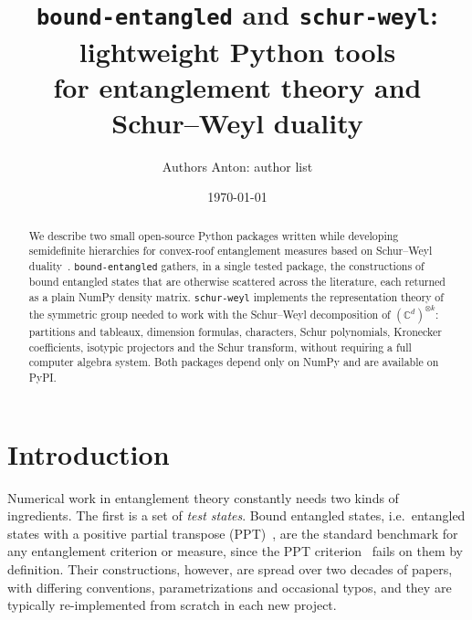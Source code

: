 \documentclass[aps,pra,twocolumn,superscriptaddress,groupedaddress]{revtex4-2}
\newcommand{\C}{\mathds{C}}
\newcommand{\code}[1]{\texttt{#1}}
\newcommand{\anton}[1]{{\color{antongreen} Anton: #1}}
\begin{document}
\title{\code{bound-entangled} and \code{schur-weyl}: lightweight Python tools\\
for entanglement theory and Schur--Weyl duality}

\author{Authors \anton{author list}}

\date{\today}

\begin{abstract}
We describe two small open-source Python packages written while developing
semidefinite hierarchies for convex-roof entanglement measures based on
Schur--Weyl duality~\cite{mainpaper}. \code{bound-entangled} gathers, in a
single tested package, the constructions of bound entangled states that are
otherwise scattered across the literature, each returned as a plain NumPy
density matrix. \code{schur-weyl} implements the representation theory of the
symmetric group needed to work with the Schur--Weyl decomposition of
$(\C^d)^{\otimes k}$: partitions and tableaux, dimension formulas, characters,
Schur polynomials, Kronecker coefficients, isotypic projectors and the Schur
transform, without requiring a full computer algebra system. Both packages
depend only on NumPy and are available on PyPI.
\end{abstract}

\maketitle

\section{Introduction}

Numerical work in entanglement theory constantly needs two kinds of
ingredients. The first is a set of \emph{test states}. Bound entangled states,
i.e.\ entangled states with a positive partial transpose
(PPT)~\cite{Horodecki1998}, are the standard benchmark for any entanglement
criterion or measure, since the PPT criterion~\cite{Peres1996} fails on them by
definition. Their constructions, however, are spread over two decades of papers,
with differing conventions, parametrizations and occasional typos, and they are
typically re-implemented from scratch in each new project.
\end{document}
